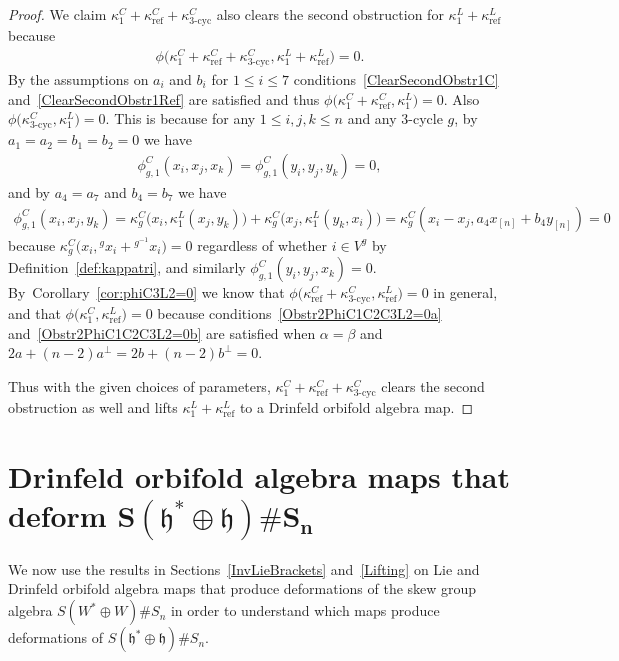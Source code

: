 \documentclass[pdftex]{sigma}
\numberwithin{equation}{section}
\newcommand{\actby}[1]{{}^{#1}}
\newcommand{\actbylessspace}[1]{{}^{#1}\!}
\DeclareMathOperator{\refl}{ref}
\DeclareMathOperator{\tri}{3-cyc}
\begin{document}
\begin{proof}
We claim $\kappa^C_1+\kappa^C_{\refl}+\kappa^C_{\tri}$ also clears the second obstruction
for $\kappa^L_1+\kappa^L_{\refl}$ because
\begin{gather*}
\phi\big(\kappa^C_1+\kappa^C_{\refl}+\kappa^C_{\tri},\kappa^L_1+\kappa^L_{\refl}\big)=0.
\end{gather*}
By the assumptions on $a_i$ and $b_i$ for $1\leq i \leq 7$
conditions~\eqref{ClearSecondObstr1C} and~\eqref{ClearSecondObstr1Ref} are satisfied and thus
$\phi\big(\kappa^C_1+\kappa^C_{\refl},\kappa^L_1\big)=0$.
Also $\phi\big(\kappa^C_{\tri},\kappa^L_1\big)=0$. This is because
for any $1\leq i,j,k \leq n$ and any $3$-cycle $g$,
by $a_1=a_2=b_1=b_2=0$ we have
\begin{gather*}
\phi^C_{g,1}(x_i,x_j,x_k)=\phi^C_{g,1}(y_i,y_j,y_k)=0,
\end{gather*}
and by $a_4=a_7$ and $b_4=b_7$ we have
\begin{align*}
\phi^C_{g,1}(x_i,x_j,y_k)
=\kappa^C_g\big(x_i,\kappa^L_1(x_j,y_k)\big)+\kappa^C_g\big(x_j,\kappa^L_1(y_k,x_i)\big)
=\kappa^C_g(x_i-x_j,a_4 x_{[n]} + b_4 y_{[n]}) =0
\end{align*}
because $\kappa^C_g\big(x_i,\actby{g}x_i+\actbylessspace{g^{-1}}x_i\big)=0$
regardless of whether $i \in V^g$ by Definition~\ref{def:kappatri},
and similarly $\phi^C_{g,1}(y_i,y_j,x_k)=0$. By~Corollary~\ref{cor:phiC3L2=0} we know that
$\phi\big(\kappa^C_{\refl}+\kappa^C_{\tri},\kappa^L_{\refl}\big)=0$ in general,
and that $\phi\big(\kappa^C_1,\kappa^L_{\refl}\big)=0$ because
conditions~\eqref{Obstr2PhiC1C2C3L2=0a} and~\eqref{Obstr2PhiC1C2C3L2=0b}
are satisfied when
$\alpha=\beta$ and $2a+(n-2)a^\perp=2b+(n-2)b^\perp=0$.

Thus with the given choices of parameters,
$\kappa^C_1+\kappa^C_{\refl}+\kappa^C_{\tri}$ clears the second obstruction
as well and lifts $\kappa^L_1+\kappa^L_{\refl}$ to a Drinfeld orbifold algebra map.
\end{proof}

\section[Drinfeld orbifold algebra maps that deform S(h* + h)S_n]
{Drinfeld orbifold algebra maps that deform $\boldsymbol{S(\mathfrak{h}^*\oplus\mathfrak{h})\# S_n}$}\label{DoubledStandardDefs}

We now use the results in Sections~\ref{InvLieBrackets} and~\ref{Lifting}
on Lie and Drinfeld orbifold algebra
maps that produce deformations of the skew group algebra $S(W^* \oplus W)\# S_n$
in order to understand which maps produce deformations of $S(\mathfrak{h}^*\oplus\mathfrak{h})\# S_n$.
\end{document}
